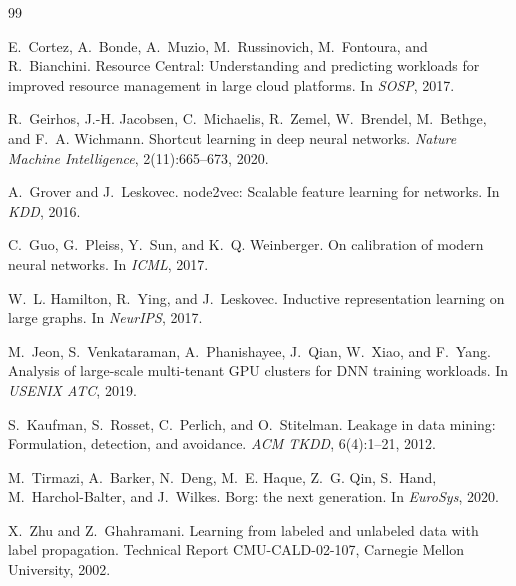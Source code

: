 \documentclass[11pt]{article}
\begin{document}
{\small

\begin{thebibliography}{99}

E.~Cortez, A.~Bonde, A.~Muzio, M.~Russinovich, M.~Fontoura, and R.~Bianchini.
\newblock Resource Central: Understanding and predicting workloads for improved
resource management in large cloud platforms.
\newblock In \emph{SOSP}, 2017.

R.~Geirhos, J.-H. Jacobsen, C.~Michaelis, R.~Zemel, W.~Brendel, M.~Bethge, and
F.~A. Wichmann.
\newblock Shortcut learning in deep neural networks.
\newblock \emph{Nature Machine Intelligence}, 2(11):665--673, 2020.

A.~Grover and J.~Leskovec.
\newblock node2vec: Scalable feature learning for networks.
\newblock In \emph{KDD}, 2016.

C.~Guo, G.~Pleiss, Y.~Sun, and K.~Q. Weinberger.
\newblock On calibration of modern neural networks.
\newblock In \emph{ICML}, 2017.

W.~L. Hamilton, R.~Ying, and J.~Leskovec.
\newblock Inductive representation learning on large graphs.
\newblock In \emph{NeurIPS}, 2017.

M.~Jeon, S.~Venkataraman, A.~Phanishayee, J.~Qian, W.~Xiao, and F.~Yang.
\newblock Analysis of large-scale multi-tenant GPU clusters for DNN training
workloads.
\newblock In \emph{USENIX ATC}, 2019.

S.~Kaufman, S.~Rosset, C.~Perlich, and O.~Stitelman.
\newblock Leakage in data mining: Formulation, detection, and avoidance.
\newblock \emph{ACM TKDD}, 6(4):1--21, 2012.

M.~Tirmazi, A.~Barker, N.~Deng, M.~E. Haque, Z.~G. Qin, S.~Hand,
M.~Harchol-Balter, and J.~Wilkes.
\newblock Borg: the next generation.
\newblock In \emph{EuroSys}, 2020.

X.~Zhu and Z.~Ghahramani.
\newblock Learning from labeled and unlabeled data with label propagation.
\newblock Technical Report CMU-CALD-02-107, Carnegie Mellon University, 2002.

\end{thebibliography}
}
\end{document}
